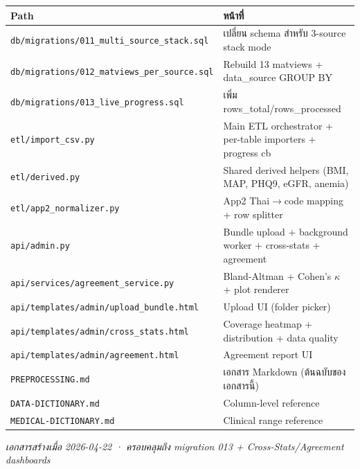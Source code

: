 \documentclass[11pt,a4paper]{article}
\begin{document}
\begin{center}
\footnotesize
\begin{tabularx}{\linewidth}{l X}
\toprule
\textbf{Path} & \textbf{หน้าที่} \\
\midrule
\texttt{db/migrations/011\_multi\_source\_stack.sql} & เปลี่ยน schema สำหรับ 3-source stack mode \\
\texttt{db/migrations/012\_matviews\_per\_source.sql} & Rebuild 13 matviews + data\_source GROUP BY \\
\texttt{db/migrations/013\_live\_progress.sql} & เพิ่ม rows\_total/rows\_processed \\
\texttt{etl/import\_csv.py} & Main ETL orchestrator + per-table importers + progress cb \\
\texttt{etl/derived.py} & Shared derived helpers (BMI, MAP, PHQ9, eGFR, anemia) \\
\texttt{etl/app2\_normalizer.py} & App2 Thai$\rightarrow$code mapping + row splitter \\
\texttt{api/admin.py} & Bundle upload + background worker + cross-stats + agreement \\
\texttt{api/services/agreement\_service.py} & Bland-Altman + Cohen's $\kappa$ + plot renderer \\
\texttt{api/templates/admin/upload\_bundle.html} & Upload UI (folder picker) \\
\texttt{api/templates/admin/cross\_stats.html} & Coverage heatmap + distribution + data quality \\
\texttt{api/templates/admin/agreement.html} & Agreement report UI \\
\texttt{PREPROCESSING.md} & เอกสาร Markdown (ต้นฉบับของเอกสารนี้) \\
\texttt{DATA-DICTIONARY.md} & Column-level reference \\
\texttt{MEDICAL-DICTIONARY.md} & Clinical range reference \\
\bottomrule
\end{tabularx}
\end{center}

\vspace{0.5cm}
\begin{center}
\small\color{gray}\itshape
เอกสารสร้างเมื่อ 2026-04-22 · ครอบคลุมถึง migration 013 + Cross-Stats/Agreement dashboards
\end{center}
\end{document}
